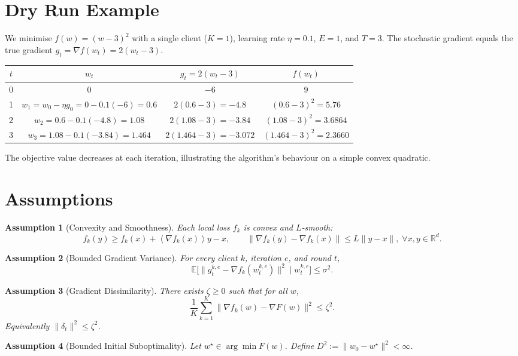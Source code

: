 \documentclass[11pt]{article}
\newtheorem{assumption}{Assumption}
\newcommand{\E}{\mathbb{E}}
\newcommand{\inner}[1]{\left\langle#1\right\rangle}
\newcommand{\R}{\mathbb{R}}
\newcommand{\grad}{\nabla}
\newcommand{\del}{\delta}
\begin{document}
\section*{Dry Run Example}
We minimise $f(w)=(w-3)^2$ with a single client ($K=1$), learning rate $\eta=0.1$, $E=1$, and $T=3$.
The stochastic gradient equals the true gradient $g_t = \grad f(w_t)=2(w_t-3)$.

\begin{center}
\begin{tabular}{c|c|c|c}
$t$ & $w_t$ & $g_t=2(w_t-3)$ & $f(w_t)$\\ \hline
0 & $0$ & $-6$ & $9$\\
1 & $w_1 = w_0-\eta g_0 = 0-0.1(-6)=0.6$ & $2(0.6-3)=-4.8$ & $(0.6-3)^2=5.76$\\
2 & $w_2 = 0.6-0.1(-4.8)=1.08$ & $2(1.08-3)=-3.84$ & $(1.08-3)^2=3.6864$\\
3 & $w_3 = 1.08-0.1(-3.84)=1.464$ & $2(1.464-3)=-3.072$ & $(1.464-3)^2=2.3660$
\end{tabular}
\end{center}
The objective value decreases at each iteration, illustrating the algorithm’s behaviour on a simple convex quadratic.

\newpage
\section*{Assumptions}
\begin{assumption}[Convexity and Smoothness]\label{ass:convex}
Each local loss $f_k$ is convex and $L$‑smooth:
\[
f_k(y)\ge f_k(x)+\inner{\grad f_k(x)}{y-x},\qquad
\|\grad f_k(y)-\grad f_k(x)\|\le L\|y-x\|,\;\forall x,y\in\R^d.
\]
\end{assumption}

\begin{assumption}[Bounded Gradient Variance]\label{ass:variance}
For every client $k$, iteration $e$, and round $t$,
\[
\E\!\big[\|g_{t}^{k,e}-\grad f_k(w_{t}^{k,e})\|^2\mid w_{t}^{k,e}\big]\le\sigma^2 .
\]
\end{assumption}

\begin{assumption}[Gradient Dissimilarity]\label{ass:dissimilarity}
There exists $\zeta\ge0$ such that for all $w$,
\[
\frac1K\sum_{k=1}^{K}\big\|\grad f_k(w)-\grad F(w)\big\|^2\le\zeta^2 .
\]
Equivalently $\|\del_t\|^2\le\zeta^2$.
\end{assumption}

\begin{assumption}[Bounded Initial Suboptimality]\label{ass:init}
Let $w^\star\in\arg\min F(w)$.  Define $D^2:=\|w_0-w^\star\|^2<\infty$.
\end{assumption}
\end{document}

